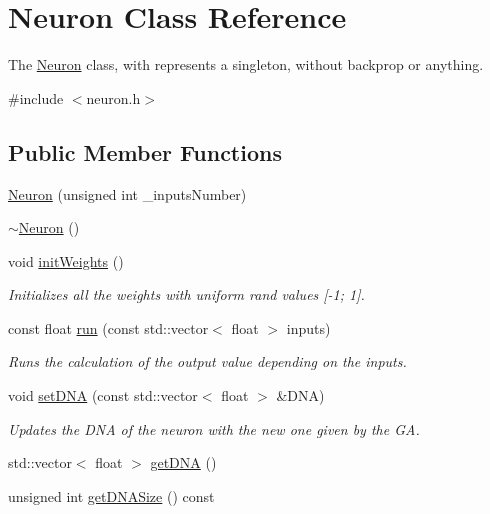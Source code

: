 \hypertarget{class_neuron}{\section{Neuron Class Reference}
\label{class_neuron}
}


The \hyperlink{class_neuron}{Neuron} class, with represents a singleton, without backprop or anything.  




{\ttfamily \#include $<$neuron.\-h$>$}

\subsection*{Public Member Functions}
\begin{DoxyCompactItemize}
\item 
\hyperlink{class_neuron_aac37e4753166ab39e0f4f6d90fdeda57}{Neuron} (unsigned int \-\_\-inputs\-Number)
\item 
\hyperlink{class_neuron_a94a250ce7e167760e593979b899745b1}{$\sim$\-Neuron} ()
\item 
void \hyperlink{class_neuron_abb3a85d2adf4a9c5a5b646c83086a2ae}{init\-Weights} ()
\begin{DoxyCompactList}\small\item\em Initializes all the weights with uniform rand values \mbox{[}-\/1; 1\mbox{]}. \end{DoxyCompactList}\item 
const float \hyperlink{class_neuron_a1d1bedb17ff3d87afcc282421579ad5f}{run} (const std\-::vector$<$ float $>$ inputs)
\begin{DoxyCompactList}\small\item\em Runs the calculation of the output value depending on the inputs. \end{DoxyCompactList}\item 
void \hyperlink{class_neuron_a873e07fce168dfde42961ea151593c9f}{set\-D\-N\-A} (const std\-::vector$<$ float $>$ \&D\-N\-A)
\begin{DoxyCompactList}\small\item\em Updates the D\-N\-A of the neuron with the new one given by the G\-A. \end{DoxyCompactList}\item 
std\-::vector$<$ float $>$ \hyperlink{class_neuron_a2626c0a0fa4dbca17dc7fd9b3b390c07}{get\-D\-N\-A} ()
\item 
unsigned int \hyperlink{class_neuron_a40d81d3ea3f2af3e2f3297533132fd31}{get\-D\-N\-A\-Size} () const 
\end{DoxyCompactItemize}


